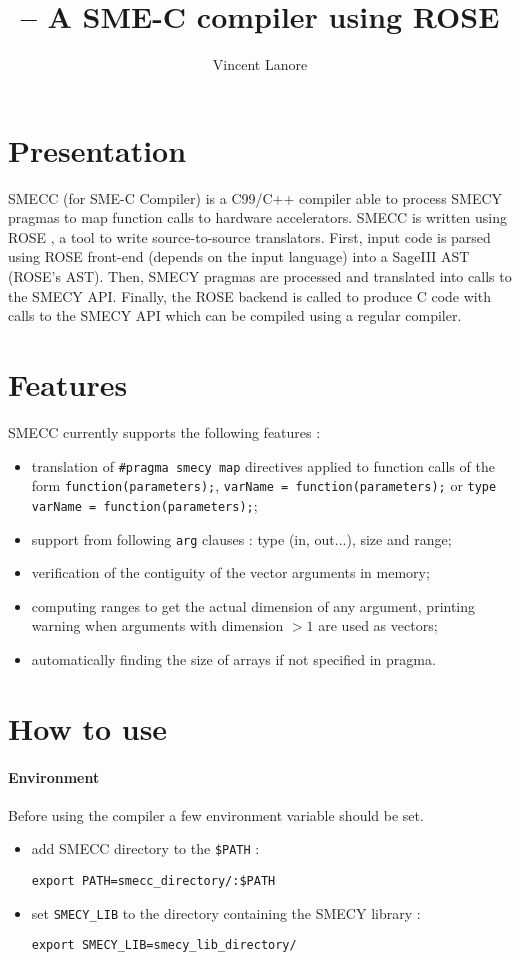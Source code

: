 \documentclass[a4paper,11pt]{article}
\title{\scompiler -- A SME-C compiler using ROSE}
\author{Vincent \sc Lanore}
\newcommand{\scompiler}{SMECC }
\begin{document}
	\maketitle

	\section{Presentation}
		\scompiler (for SME-C Compiler) is a C99/C++ compiler able to process SMECY pragmas to map function calls to hardware accelerators. \scompiler is written using ROSE \cite{usermanual,tuto}, a tool to write source-to-source translators. First, input code is parsed using ROSE front-end (depends on the input language) into a SageIII AST (ROSE's AST). Then, SMECY pragmas are processed and translated into calls to the SMECY API. Finally, the ROSE backend is called to produce C code with calls to the SMECY API which can be compiled using a regular compiler.

	\section{Features}
		\scompiler currently supports the following features :
		\begin{itemize}
			\item translation of \verb+#pragma smecy map+ directives applied to function calls of the form \verb+function(parameters);+, \verb+varName = function(parameters);+ or \verb+type varName = function(parameters);+;
			\item support from following \verb+arg+ clauses : type (in, out...), size and range;
			\item verification of the contiguity of the vector arguments in memory;
			\item computing ranges to get the actual dimension of any argument, printing warning when arguments with dimension $>1$ are used as vectors;
			\item automatically finding the size of arrays if not specified in pragma.
		\end{itemize}

	\section{How to use}
		\paragraph{Environment} Before using the compiler a few environment variable should be set.
		\begin{itemize}
			\item add \scompiler directory to the \verb+$PATH+ :
\begin{verbatim}
export PATH=smecc_directory/:$PATH
\end{verbatim}
			\item set \verb+SMECY_LIB+ to the directory containing the
              SMECY library :
\begin{verbatim}
export SMECY_LIB=smecy_lib_directory/
\end{verbatim}
            \end{itemize}
\end{document}
